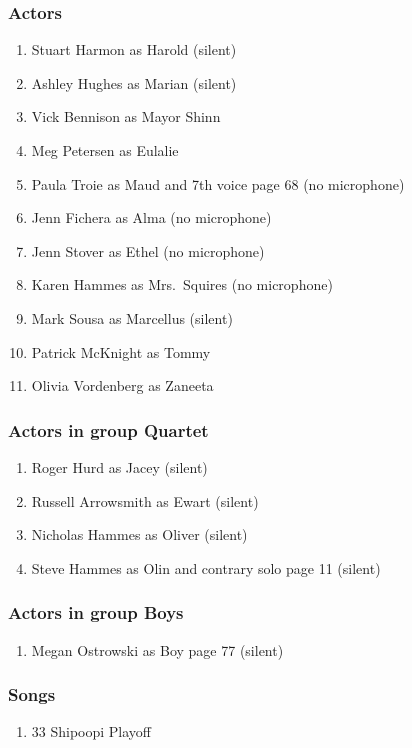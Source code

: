 \subsubsection{Actors}
\begin{enumerate}
\item Stuart Harmon as Harold (silent)
\item Ashley Hughes as Marian (silent)
\item Vick Bennison as Mayor Shinn
\item Meg Petersen as Eulalie
\item Paula Troie as Maud and 7th voice page 68 (no microphone)
\item Jenn Fichera as Alma (no microphone)
\item Jenn Stover as Ethel (no microphone)
\item Karen Hammes as Mrs.~Squires (no microphone)
\item Mark Sousa as Marcellus (silent)
\item Patrick McKnight as Tommy
\item Olivia Vordenberg as Zaneeta
\end{enumerate}
\subsubsection{Actors in group Quartet}
\begin{enumerate}
\item Roger Hurd as Jacey (silent)
\item Russell Arrowsmith as Ewart (silent)
\item Nicholas Hammes as Oliver (silent)
\item Steve Hammes as Olin and contrary solo page 11 (silent)
\end{enumerate}
\subsubsection{Actors in group Boys}
\begin{enumerate}
\item Megan Ostrowski as Boy page 77 (silent)
\end{enumerate}

\subsubsection{Songs}
\begin{enumerate}
\item 33 Shipoopi Playoff
\end{enumerate}
